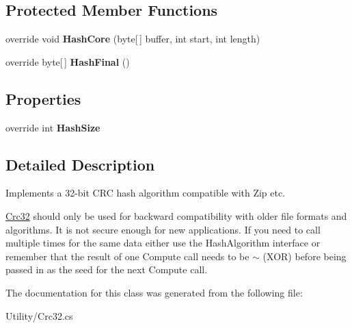 \subsection*{Protected Member Functions}
\begin{DoxyCompactItemize}
\item 
\hypertarget{class_snowflake_1_1_utility_1_1_crc32_a9635cc0df05fa4e079dfefffd801d645}{}override void {\bfseries Hash\+Core} (byte\mbox{[}$\,$\mbox{]} buffer, int start, int length)\label{class_snowflake_1_1_utility_1_1_crc32_a9635cc0df05fa4e079dfefffd801d645}

\item 
\hypertarget{class_snowflake_1_1_utility_1_1_crc32_a25a0409f3cffe53b07eff8a4571c43e4}{}override byte\mbox{[}$\,$\mbox{]} {\bfseries Hash\+Final} ()\label{class_snowflake_1_1_utility_1_1_crc32_a25a0409f3cffe53b07eff8a4571c43e4}

\end{DoxyCompactItemize}
\subsection*{Properties}
\begin{DoxyCompactItemize}
\item 
\hypertarget{class_snowflake_1_1_utility_1_1_crc32_a51ac41a193610f9cdbdeec294b61e804}{}override int {\bfseries Hash\+Size}\label{class_snowflake_1_1_utility_1_1_crc32_a51ac41a193610f9cdbdeec294b61e804}

\end{DoxyCompactItemize}


\subsection{Detailed Description}
Implements a 32-\/bit C\+R\+C hash algorithm compatible with Zip etc. 

\hyperlink{class_snowflake_1_1_utility_1_1_crc32}{Crc32} should only be used for backward compatibility with older file formats and algorithms. It is not secure enough for new applications. If you need to call multiple times for the same data either use the Hash\+Algorithm interface or remember that the result of one Compute call needs to be $\sim$ (X\+O\+R) before being passed in as the seed for the next Compute call. 

The documentation for this class was generated from the following file\+:\begin{DoxyCompactItemize}
\item 
Utility/Crc32.\+cs\end{DoxyCompactItemize}
